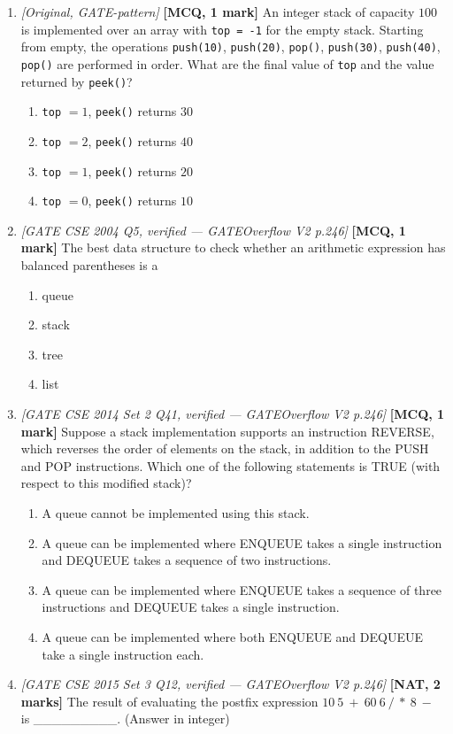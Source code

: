 \documentclass[11pt]{article}
\begin{document}
\begin{enumerate}
\item[\textbf{Q7}] \textit{[Original, GATE-pattern]} \textbf{[MCQ, 1 mark]} An integer stack of capacity $100$ is implemented over an array with \texttt{top = -1} for the empty stack. Starting from empty, the operations \texttt{push(10)}, \texttt{push(20)}, \texttt{pop()}, \texttt{push(30)}, \texttt{push(40)}, \texttt{pop()} are performed in order. What are the final value of \texttt{top} and the value returned by \texttt{peek()}?
\begin{enumerate}
  \item[(A)] \texttt{top} $= 1$, \texttt{peek()} returns $30$
  \item[(B)] \texttt{top} $= 2$, \texttt{peek()} returns $40$
  \item[(C)] \texttt{top} $= 1$, \texttt{peek()} returns $20$
  \item[(D)] \texttt{top} $= 0$, \texttt{peek()} returns $10$
\end{enumerate}

\item[\textbf{Q8}] \textit{[GATE CSE 2004 Q5, verified --- GATEOverflow V2 p.246]} \textbf{[MCQ, 1 mark]} The best data structure to check whether an arithmetic expression has balanced parentheses is a
\begin{enumerate}
  \item[(A)] queue
  \item[(B)] stack
  \item[(C)] tree
  \item[(D)] list
\end{enumerate}

\item[\textbf{Q9}] \textit{[GATE CSE 2014 Set 2 Q41, verified --- GATEOverflow V2 p.246]} \textbf{[MCQ, 1 mark]} Suppose a stack implementation supports an instruction REVERSE, which reverses the order of elements on the stack, in addition to the PUSH and POP instructions. Which one of the following statements is TRUE (with respect to this modified stack)?
\begin{enumerate}
  \item[(A)] A queue cannot be implemented using this stack.
  \item[(B)] A queue can be implemented where ENQUEUE takes a single instruction and DEQUEUE takes a sequence of two instructions.
  \item[(C)] A queue can be implemented where ENQUEUE takes a sequence of three instructions and DEQUEUE takes a single instruction.
  \item[(D)] A queue can be implemented where both ENQUEUE and DEQUEUE take a single instruction each.
\end{enumerate}

\item[\textbf{Q10}] \textit{[GATE CSE 2015 Set 3 Q12, verified --- GATEOverflow V2 p.246]} \textbf{[NAT, 2 marks]} The result of evaluating the postfix expression $10~5~+~60~6~/~*~8~-$ is \_\_\_\_\_\_\_\_\_. (Answer in integer)

\end{enumerate}
\end{document}

